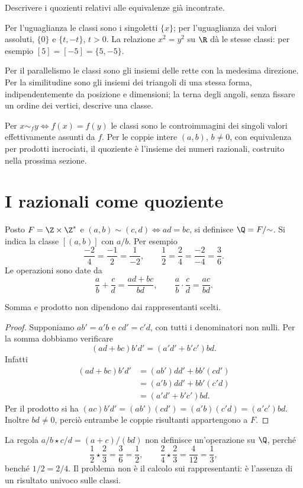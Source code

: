 \begin{esercizio}
Descrivere i quozienti relativi alle equivalenze già incontrate.
\end{esercizio}
\begin{svolgimento}
Per l'uguaglianza le classi sono i singoletti $\{x\}$; per l'uguaglianza dei valori assoluti, $\{0\}$ e $\{t,-t\}$, $t>0$. La relazione $x^2=y^2$ su $\R$ dà le stesse classi: per esempio $[5]=[-5]=\{5,-5\}$.

Per il parallelismo le classi sono gli insiemi delle rette con la medesima direzione. Per la similitudine sono gli insiemi dei triangoli di una stessa forma, indipendentemente da posizione e dimensioni; la terna degli angoli, senza fissare un ordine dei vertici, descrive una classe.

Per $x\sim_f y\iff f(x)=f(y)$ le classi sono le controimmagini dei singoli valori effettivamente assunti da $f$. Per le coppie intere $(a,b)$, $b\ne0$, con equivalenza per prodotti incrociati, il quoziente è l'insieme dei numeri razionali, costruito nella prossima sezione.
\end{svolgimento}

\section{I razionali come quoziente}
\begin{definizione}
Posto $F=\Z\times\Z^*$ e $(a,b)\sim(c,d)\iff ad=bc$, si definisce $\Q=F/{\sim}$. Si indica la classe $[(a,b)]$ con $a/b$. Per esempio
\[
\frac{-2}{4}=\frac{-1}{2}=\frac{1}{-2},
\qquad \frac12=\frac24=\frac{-2}{-4}=\frac36.
\]
Le operazioni sono date da
\[
\frac ab+\frac cd=\frac{ad+bc}{bd},
\qquad \frac ab\cdot\frac cd=\frac{ac}{bd}.
\]
\end{definizione}

\begin{proposizione}
Somma e prodotto non dipendono dai rappresentanti scelti.
\end{proposizione}
\begin{proof}
Supponiamo $ab'=a'b$ e $cd'=c'd$, con tutti i denominatori non nulli. Per la somma dobbiamo verificare
\[
(ad+bc)b'd'=(a'd'+b'c')bd.
\]
Infatti
\[
\begin{aligned}
(ad+bc)b'd'&=(ab')dd'+bb'(cd')\\
&=(a'b)dd'+bb'(c'd)\\
&=(a'd'+b'c')bd.
\end{aligned}
\]
Per il prodotto si ha $(ac)b'd'=(ab')(cd')=(a'b)(c'd)=(a'c')bd$. Inoltre $bd\ne0$, perciò entrambe le coppie risultanti appartengono a $F$.
\end{proof}

\begin{esempio}
La regola $a/b\star c/d=(a+c)/(bd)$ non definisce un'operazione su $\Q$, perché
\[
\frac12\star\frac23=\frac36=\frac12,
\qquad
\frac24\star\frac23=\frac4{12}=\frac13,
\]
benché $1/2=2/4$. Il problema non è il calcolo sui rappresentanti: è l'assenza di un risultato univoco sulle classi.
\end{esempio}
